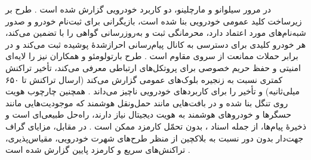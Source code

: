 در مرور سیلوانو و مارچلینو، دو کاربرد خودرویی  گزارش شده است \cite{silvanoIotaTangleCryptocurrency2020}. طرح  بر زیرساخت کلید عمومی خودرویی  بنا شده است، بازیگرانی برای ثبت‌نام خودرو و صدور شبه‌نام‌های مورد اعتماد دارد، محرمانگی ثبت و به‌روزرسانی گواهی را با  تضمین می‌کند، هر خودرو کلیدی برای دسترسی به کانال پیام‌رسانی احرازشدهٔ پوشیده ثبت می‌کند و در برابر حملات ممانعت از سروی مقاوم است \cite{silvanoIotaTangleCryptocurrency2020}. طرح بارتولومئو و همکاران نیز  را لایه‌ای امنیتی و حفظ حریم خصوصی برای پروتکل‌های ارتباطی معرفی می‌کند، تأخیر تراکنش کمتری نسبت به زنجیره بلوک‌های عمومی گزارش می‌کند (ارسال تراکنش تا ۶۵۰ میلی‌ثانیه) و تأخیر را برای کاربردهای خودرویی ناچیز می‌داند \cite{silvanoIotaTangleCryptocurrency2020}. همچنین چارچوب هویت  روی تنگل بنا شده و در بافت‌هایی مانند حمل‌ونقل هوشمند که موجودیت‌هایی مانند حسگرها و خودروهای هوشمند به هویت دیجیتال نیاز دارند، راه‌حل طبیعی‌ای است و ذخیرهٔ پیام‌ها، از جمله اسناد ، بدون تحمّل کارمزد ممکن است \cite{mazzocca2025survey}. در مقابل، مزایای گراف جهت‌دار بدون دور نسبت به بلاکچین از منظر طرح‌های شهرت خودرویی، مقیاس‌پذیری، تراکنش‌های سریع و کارمزد پایین گزارش شده است \cite{feraudoDIVADIDbasedReputation2024}.
